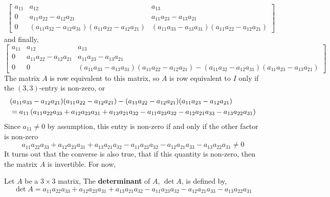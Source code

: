 \documentclass[letterpaper,12pt]{article}
\begin{document}
\begin{align*}
    \begin{bmatrix} a_{11} & a_{12} & a_{13} \\
    0 & a_{11} a_{22} - a_{12} a_{21} & a_{11} a_{23} - a_{13} a_{21} \\
    0 & (a_{11} a_{32} - a_{12} a_{31})(a_{11} a_{22} - a_{12} a_{21}) & (a_{11} a_{33} - a_{13} a_{31})(a_{11} a_{22} - a_{12} a_{21}) \end{bmatrix}
\end{align*}
and finally,
\begin{equation*}
    \begin{bmatrix} a_{11} & a_{12} & a_{13} \\
    0 & a_{11} a_{22} - a_{12} a_{21} & a_{11} a_{23} - a_{13} a_{21} \\
    0 & 0 & (a_{11} a_{33} - a_{13} a_{31})(a_{11} a_{22} - a_{12} a_{21}) - (a_{11} a_{32} - a_{12} a_{31})(a_{11} a_{23} - a_{13} a_{21}) \end{bmatrix}
\end{equation*}
The matrix $A$ is row equivalent to this matrix, so $A$ is row equivalent to $I$ only if the $(3,3)$-entry is non-zero, or
\begin{align*}
    & (a_{11} a_{33} - a_{12} a_{21})(a_{11} a_{22} - a_{12} a_{21}) - (a_{11} a_{22} - a_{12} a_{21})(a_{11} a_{23} - a_{12} a_{21}) \\
    & = a_{11} \left( a_{11} a_{22} a_{33} + a_{12} a_{23} a_{31} + a_{13} a_{21} a_{32} - a_{11} a_{23} a_{32} - a_{12} a_{21} a_{33} - a_{13} a_{22} a_{31} \right)
\end{align*}
Since $a_{11} \neq 0$ by assumption, this entry is non-zero if and only if the other factor is non-zero
\begin{equation*}
    a_{11} a_{22} a_{33} + a_{12} a_{23} a_{31} + a_{13} a_{21} a_{32} - a_{11} a_{23} a_{32} - a_{12} a_{21} a_{33} - a_{13} a_{22} a_{31} \neq 0
\end{equation*}
It turns out that the converse is also true, that if this quantity is non-zero, then the matrix $A$ is invertible. For now,

\begin{definition}
Let $A$ be a $3 \times 3$ matrix, The \textbf{determinant} of $A$, $\det{A}$, is defined by,
\begin{equation*}
    \det{A} = a_{11} a_{22} a_{33} + a_{12} a_{23} a_{31} + a_{13} a_{21} a_{32} - a_{11} a_{23} a_{32} - a_{12} a_{21} a_{33} - a_{13} a_{22} a_{31}
\end{equation*}
\end{definition}
\end{document}
